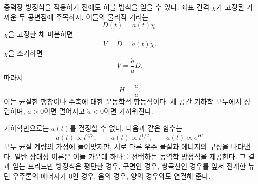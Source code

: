 중력장 방정식을 적용하기 전에도 허블 법칙을 얻을 수 있다. 좌표 간격 \(\chi\)가 고정된 가까운 두 공변점에 주목하자. 이들의 물리적 거리는
\begin{equation}
D(t)=a(t)\chi.
\label{eq:c03-comoving-distance}
\end{equation}
\(\chi\)을 고정한 채 미분하면
\begin{equation}
V=\dot D=\dot a(t)\chi.
\end{equation}
\(\chi\)을 소거하면
\begin{equation}
V = \frac{\dot a}{a} D.
\label{eq:c03-hubble-law}
\end{equation}
따라서
\begin{equation}
H = \frac{\dot a}{a}.
\label{eq:c03-hubble-parameter}
\end{equation}
이는 균질한 팽창이나 수축에 대한 운동학적 항등식이다. 세 공간 기하학 모두에서 성립하며, \(\dot a>0\)이면 멀어지고 \(\dot a<0\)이면 가까워진다.

기하학만으로는 \(a(t)\)를 결정할 수 없다. 다음과 같은 함수는
\begin{equation}
a(t)\propto t^{2/3},
\qquad
a(t)\propto t^{1/2},
\qquad
a(t)\propto e^{Ht}
\end{equation}
모두 균질 계량의 가정에 들어맞지만, 서로 다른 우주 물질과 에너지의 구성을 나타낸다. 일반 상대성 이론은 이들 가운데 하나를 선택하는 동역학 방정식을 제공한다. 그 결과 얻는 프리드만 방정식은 평탄한 경우, 구면인 경우, 쌍곡선인 경우를 앞서 전개한 뉴턴 우주론의 에너지가 0인 경우, 음의 경우, 양의 경우와도 연결해 준다.

\begin{classroomqa}
\end{classroomqa}

\begin{classroomqa}
\end{classroomqa}

